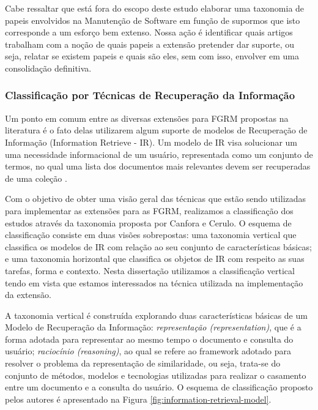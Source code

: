 \documentclass[msc]{ppgccufmg} %
\begin{document}
Cabe ressaltar que está fora do escopo deste estudo elaborar uma taxonomia de papeis envolvidos na
Manutenção de Software em função de supormos que isto corresponde a um esforço bem extenso. Nossa
ação é identificar quais artigos trabalham com a noção de quais papeis a extensão pretender dar
suporte,  ou seja,  relatar se existem papeis e quais são eles,  sem com isso, envolver em uma
consolidação definitiva.

\subsubsection{Classificação por Técnicas de Recuperação da Informação}
\label{subsubsec:map-esaquema-tecnicas-ir}

Um ponto em comum entre as diversas extensões para FGRM propostas na literatura é o fato delas utilizarem algum suporte de modelos de Recuperação de Informação (Information Retrieve - IR). Um modelo de IR visa solucionar um uma necessidade informacional de um usuário, representada como um conjunto de termos, no qual uma lista dos documentos mais relevantes devem ser recuperadas de uma coleção \cite{baeza1999modern}. 

Com o objetivo de obter uma visão geral das técnicas que estão sendo utilizadas para implementar as
extensões para as FGRM, realizamos a classificação dos estudos através da taxonomia proposta por
Canfora e Cerulo\cite{cerulo2004taxonomy}. O esquema de classificação consiste em duas visões
sobrepostas: uma taxonomia vertical que classifica os modelos de IR com relação ao seu conjunto
de características básicas; e uma taxonomia horizontal que classifica os objetos de IR com respeito
as suas tarefas, forma e contexto\cite{cerulo2004taxonomy}. Nesta dissertação utilizamos a
classificação vertical tendo em vista que estamos interessados na técnica utilizada na implementação da extensão.



A taxonomia vertical é construída explorando duas características básicas de um Modelo de
Recuperação da Informação: \textit{representação (representation)}, que é a forma adotada para representar ao mesmo
tempo o documento e consulta do usuário; \textit{raciocínio (reasoning)}, ao qual se refere ao framework adotado
para resolver o problema da representação de similaridade, ou seja, trata-se do conjunto de métodos, modelos e tecnologias utilizadas para realizar o casamento entre um documento e a consulta do usuário. O esquema de classificação proposto pelos autores é apresentado na Figura \ref{fig:information-retrieval-model}.
\end{document}
